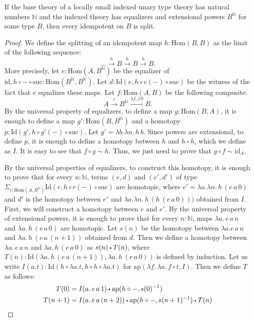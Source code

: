 \documentclass[reqno]{amsart}
\theoremstyle{definition}
\theoremstyle{remark}
\newcommand{\fs}[1]{\mathrm{#1}}
\newcommand{\Hom}{\fs{Hom}}
\newcommand{\Id}{\fs{Id}}
\newcommand{\sym}[1]{#1^{-1}}
\newcommand{\id}{\fs{id}}
\newcommand{\pmap}{\fs{ap}}
\numberwithin{figure}{section}
\newcommand{\ct}{%
  \mathchoice{\mathbin{\raisebox{0.25ex}{$\displaystyle\centerdot$}}}%
             {\mathbin{\raisebox{0.25ex}{$\centerdot$}}}%
             {\mathbin{\raisebox{0.25ex}{$\scriptstyle\,\centerdot\,$}}}%
             {\mathbin{\raisebox{0.25ex}{$\scriptscriptstyle\,\centerdot\,$}}}
}
\begin{document}
\begin{prop}
If the base theory of a locally small indexed unary type theory has natural numbers $\mathbb{N}$ and the indexed theory has equalizers and extensional powers $B^\mathbb{N}$ for some type $B$, then every idempotent on $B$ is split.
\end{prop}
\begin{proof}
We define the splitting of an idempotent map $h : \Hom(B,B)$ as the limit of the following sequence:
\[ \ldots \xrightarrow{h} B \xrightarrow{h} B \xrightarrow{h} B. \]
More precisely, let $e : \Hom(A,B^\mathbb{N})$ be the equalizer of $\id, h \circ - \circ \mathrm{suc} : \Hom(B^\mathbb{N},B^\mathbb{N})$.
Let $d : \Id(e, h \circ e(-) \circ \mathrm{suc})$ be the witness of the fact that $e$ equalizes these maps.
Let $f : \Hom(A,B)$ be the following composite:
\[ A \xrightarrow{e} B^\mathbb{N} \xrightarrow{\lambda f.\,f\,0} B. \]
By the universal property of equalizers, to define a map $g : \Hom(B,A)$, it is enough to define a map $g' : \Hom(B,B^\mathbb{N})$ and a homotopy $p : \Id(g', h \circ g'(-) \circ \mathrm{suc})$.
Let $g' = \lambda b. \lambda n.\,h\,b$.
Since powers are extensional, to define $p$, it is enough to define a homotopy between $h$ and $h \circ h$, which we define as $I$.
It is easy to see that $f \circ g \sim h$.
Thus, we just need to prove that $g \circ f \sim \id_A$.

By the universal properties of equalizers, to construct this homotopy, it is enough to prove that for every $n : \mathbb{N}$, terms $(e,d)$ and $(e',d')$ of type $\Sigma_{r : \Hom(A,B^\mathbb{N})} \Id(r, h \circ r(-) \circ \mathrm{suc})$ are homotopic,
where $e' = \lambda a. \lambda n.\,h\,(e\,a\,0)$ and $d'$ is the homotopy between $e'$ and $\lambda a. \lambda n.\,h\,(h\,(e\,a\,0)))$ obtained from $I$.
First, we will construct a homotopy between $e$ and $e'$.
By the universal property of extensional powers, it is enough to prove that for every $n : \mathbb{N}$, maps $\lambda a.\,e\,a\,n$ and $\lambda a.\,h\,(e\,a\,0)$ are homotopic.
Let $s(n)$ be the homotopy between $\lambda a.e\,a\,n$ and $\lambda a.\,h\,(e\,a\,(n+1))$ obtained from $d$.
Then we define a homotopy between $\lambda a.\,e\,a\,n$ and $\lambda a.\,h\,(e\,a\,0)$ as $s(n) \ct T(n)$, where $T(n) : \Id(\lambda a.\,h\,(e\,a\,(n+1)), \lambda a.\,h\,(e\,a\,0))$ is defined by induction.
Let us write $I(a.t) : \Id(h \circ \lambda a.t, h \circ h \circ \lambda a.t)$ for $\pmap(\lambda f.\,\lambda a.\,f \circ t, I)$.
Then we define $T$ as follows:
\begin{align*}
T(0) & = I(a.\,e\,a\,1) \ct \pmap(h \circ -, \sym{s(0)}) \\
T(n+1) & = I(a.\,e\,a\,(n+2)) \ct \pmap(h \circ -, \sym{s(n+1)}) \ct T(n)
\end{align*}


\end{proof}
\end{document}
